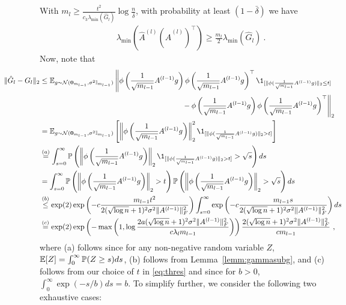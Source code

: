 With $m_l \geq \frac{t^2}{c_3 \lambda_{\min}(\hat{G}_l)} \log \frac{n}{\bar{\delta}}$, with probability at least $(1-\bar{\delta})$ we have 
\begin{align}
\label{eq:lowerbound_hat_A_l}
\lambda_{\min}( \hat{A}^{(l)} ( \hat{A}^{(l)})^\top ) \geq \frac{m_l}{2} \lambda_{\min}(\hat{G}_l) ~.
\end{align}
Now, note that
\begin{align*}
\hspace*{-25mm}
\| \hat{G}_l - G_l \|_2 & \leq 
 \E_{g \sim \cN(\bm{0}_{m_{l-1}},\sigma^2 \I_{m_{l-1}})} \left\|  \phi\left( \frac{1}{\sqrt{m_{l-1}}} A^{(l-1)} g\right) \phi \left( \frac{1}{\sqrt{m_{l-1}}} A^{(l-1)} g \right)^\top \1_{[\| \phi ( \frac{1}{\sqrt{m_{l-1}}} A^{(l-1)} g) \|_2 \leq t]} \right. \\
 &  \left. \phantom{\E   \phi\left( \frac{1}{\sqrt{m_{l-1}}} A^{(l-1)} g\right) \phi \left( \frac{1}{\sqrt{m_{l-1}}} A^{(l-1)} g \right)^\top } 
 -  \phi\left( \frac{1}{\sqrt{m_{l-1}}} A^{(l-1)} g \right) \phi\left( \frac{1}{\sqrt{m_{l-1}}} A^{(l-1)} g \right)^\top \right\|_2 \\
& = \E_{g \sim \cN(\bm{0}_{m_{l-1}},\sigma^2 \I_{m_{l-1}})}\left[ \left\| \phi \left( \frac{1}{\sqrt{m_{l-1}}} A^{(l-1)} g \right) \right\|_2^2 \1_{[\| \phi ( \frac{1}{\sqrt{m_{l-1}}} A^{(l-1)} g) \|_2 > t]} \right]    \\
& \overset{(a)}{=} \int_{s=0}^{\infty} \P\left( \left\| \phi \left( \frac{1}{\sqrt{m_{l-1}}} A^{(l-1)} g \right) \right\|_2 \1_{[\| \phi ( \frac{1}{\sqrt{m_{l-1}}} A^{(l-1)} g) \|_2 > t]} > \sqrt{s} \right) ds \\
& = \int_{s=0}^{\infty} \P\left( \left\| \phi \left( \frac{1}{\sqrt{m_{l-1}}} A^{(l-1)} g \right) \right\|_2 > t \right) \P\left( \left\| \phi \left( \frac{1}{\sqrt{m_{l-1}}} A^{(l-1)} g \right) \right\|_2 > \sqrt{s} \right) ds \\
& \overset{(b)}{\leq}\exp(2) \exp\left( -c \frac{m_{l-1} t^2 }{2(\sqrt{\log n} +1)^2 \sigma^2 \| A^{(l-1)} \|_F^2} \right) \int_{s=0}^{\infty} \exp\left( -c \frac{m_{l-1} s }{2(\sqrt{\log n} +1)^2 \sigma^2 \| A^{(l-1)} \|_F^2} \right) ds \\
& \overset{(c)}{=} \exp(2) \exp\left( -  \max\left(1 , \log \frac{2a (\sqrt{\log n}  + 1)^2 \sigma^2 \| A^{(l-1)} \|_F^2}{c \lambda_l m_{l-1}} \right)  \right) \frac{2(\sqrt{\log n} +1)^2 \sigma^2 \|A^{(l-1)}\|_F^2}{cm_{l-1}} ~,
\end{align*}
where (a) follows since for any non-negative random variable $Z$,  $\mathbb{E}[Z] = \int_0^{\infty} \mathbb{P}(Z \geq s) ds$, (b) follows from Lemma~\ref{lemm:gammasubg}, and (c) follows from our choice of  $t$ in \eqref{eq:thres} and since for $b > 0$, $\int_0^\infty \exp(-s/b) ds = b$. To simplify further, we consider the following two exhaustive cases:

